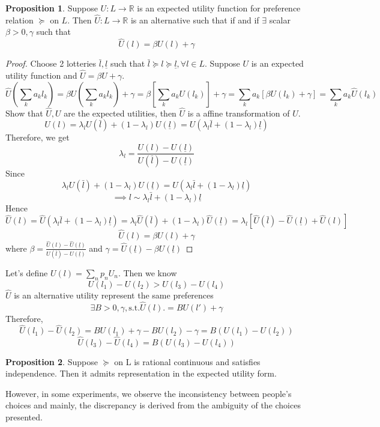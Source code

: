 \documentclass[11pt, a4paper, oneside]{article}
\theoremstyle{definition}
\newtheorem{myprop}{Proposition}
\theoremstyle{proposition}
\theoremstyle{corollary}
\theoremstyle{lemma}
\theoremstyle{theorem}
\begin{document}
\begin{myprop}
Suppose $U: L \to \mathbb{R}$ is an expected utility function for preference relation $\succeq$ on $L$. Then $\hat{U}: L \to \mathbb{R}$ is an alternative such that if and if $\exists$ scalar $\beta > 0, \gamma$ such that
$$\hat{U}(l) = \beta U(l) + \gamma$$
\end{myprop}

\begin{proof}
Choose 2 lotteries $\bar{l}, \underline{l}$ such that $\bar{l} \succeq l \succeq \underline{l}, \forall l \in L$. Suppose $U$ is an expected utility function and $\hat{U} = \beta U + \gamma$. 
$$\hat{U}\left(\sum_k a_k l_k\right) = \beta U\left(\sum_k a_k l_k\right) + \gamma = \beta\left[\sum_k a_k U(l_k)\right] + \gamma=\sum_k a_k\left[\beta U(l_k)+\gamma\right] = \sum_k a_k \hat{U}(l_k)$$ 
Show that $\hat{U}, U$ are the expected utilities, then $\hat{U}$ is a affine transformation of $U$. 
$$U(l) = \lambda_l U(\bar{l}) +(1- \lambda_l)U(\underline{l})=U(\lambda_l\bar{l} + (1-\lambda_l)\underline{l})$$ 
Therefore, we get
$$\lambda_l = \frac{U(l)-U(\underline{l})}{U(\bar{l}) - U(\underline{l})}$$
Since 
$$\lambda_lU(\bar{l}) + (1- \lambda_l)U(\underline{l}) = U(\lambda_l\bar{l} + (1-\lambda_l)\underline{l})$$
$$\implies l \sim \lambda_l \bar{l} +(1- \lambda_l)\underline{l}$$
Hence
$$\hat{U}(l) = \hat{U}(\lambda_l \bar{l} + (1-\lambda_l)\underline{l}) = \lambda_l \hat{U}(\bar{l}) + (1- \lambda_l)\hat{U}(\underline{l}) = \lambda_l[\hat{U}(\bar{l}) - \hat{U}(\underline{l}) + \hat{U}(l)]$$
$$\hat{U}(l) = \beta U(l) + \gamma$$ where $\beta =  \frac{\hat{U}(l)-\hat{U}(\underline{l})}{U(\bar{l}) - U(\underline{l})}$ and $\gamma = \hat{U}(\underline{l}) - \beta U(\underline{l})$
\end{proof}

Let's define $U(l) = \sum_n p_nU_n$. Then we know 
$$U(l_1) - U(l_2) > U(l_3) - U(l_4)$$
$\hat{U}$ is an alternative utility represent the same preferences
$$\exists B >0, \gamma, \text{s.t.} \hat{U}(l). =B U(l') +\gamma$$
Therefore, 
$$\hat{U}(l_1) - \hat{U}(l_2) =B U(l_1) +\gamma - BU(l_2) - \gamma = B(U(l_1) - U(l_2))$$
$$\hat{U}(l_3) - \hat{U}(l_4) = B(U(l_3) - U(l_4))$$

\begin{myprop}
Suppose $\succeq$ on L is rational continuous and satisfies independence. Then it admits representation in the expected utility form. 
\end{myprop}

However, in some experiments, we observe the inconsistency between people's choices and mainly, the discrepancy is derived from the ambiguity of the choices presented. 
\end{document}
